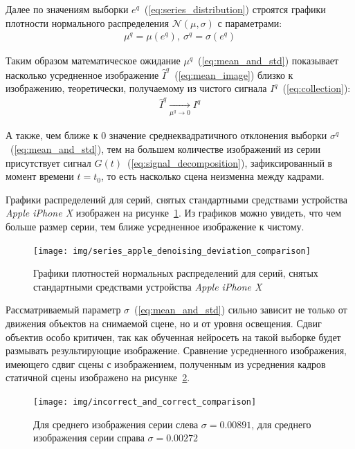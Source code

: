 Далее по значениям выборки $e^q$~(\ref{eq:series_distribution}) строятся графики плотности нормального распределения $\mathcal{N}(\mu, \sigma)$ с параметрами:
\begin{eqnarray}\label{eq:mean_and_std}
\mu^q = \mu(e^q),\ \sigma^q = \sigma(e^q)
\end{eqnarray}

Таким образом математическое ожидание $\mu^q$~(\ref{eq:mean_and_std}) показывает насколько усредненное изображение $\hat{I}^q$~(\ref{eq:mean_image}) близко к изображению, теоретически, получаемому из чистого сигнала $I^q$~(\ref{eq:collection}): 
\begin{eqnarray}\label{eq:mean_image_approximation}
\hat{I}^q \xrightarrow[\mu^q \rightarrow 0]{} I^q
\end{eqnarray}

А также, чем ближе к $0$ значение среднеквадратичного отклонения выборки $\sigma^q$~(\ref{eq:mean_and_std}), тем на большем количестве изображений из серии присутствует сигнал $G(t)$~(\ref{eq:signal_decomposition}), зафиксированный в момент времени $t = t_0$, то есть насколько сцена неизменна между кадрами.

Графики распределений для серий, снятых стандартными средствами устройства \textit{Apple iPhone X} изображен на рисунке~\ref{fig:distribuion_after_apple_denoising}. Из графиков можно увидеть, что чем больше размер серии, тем ближе усредненное изображение к чистому.

\begin{figure}[h!]
	\centering
	\texttt{[image: img/series\_apple\_denoising\_deviation\_comparison]}
	\caption{Графики плотностей нормальных распределений для серий, снятых стандартными средствами устройства \textit{Apple iPhone X}}
	\label{fig:distribuion_after_apple_denoising}
\end{figure}


Рассматриваемый параметр $\sigma$~(\ref{eq:mean_and_std}) сильно зависит не только от движения объектов на снимаемой сцене, но и от уровня освещения. Сдвиг объектив особо критичен, так как обученная нейросеть на такой выборке будет размывать результирующие изображение. Сравнение усредненного изображения, имеющего сдвиг сцены с изображением, полученным из усреднения кадров статичной сцены изображено на рисунке~\ref{fig:deviations_comparision}. 

\begin{figure}[H]
	\centering
	\texttt{[image: img/incorrect\_and\_correct\_comparison]}
	\caption{Для среднего изображения серии слева $\sigma = 0.00891$, для среднего изображения серии справа $\sigma = 0.00272$}
	\label{fig:deviations_comparision}
\end{figure}

